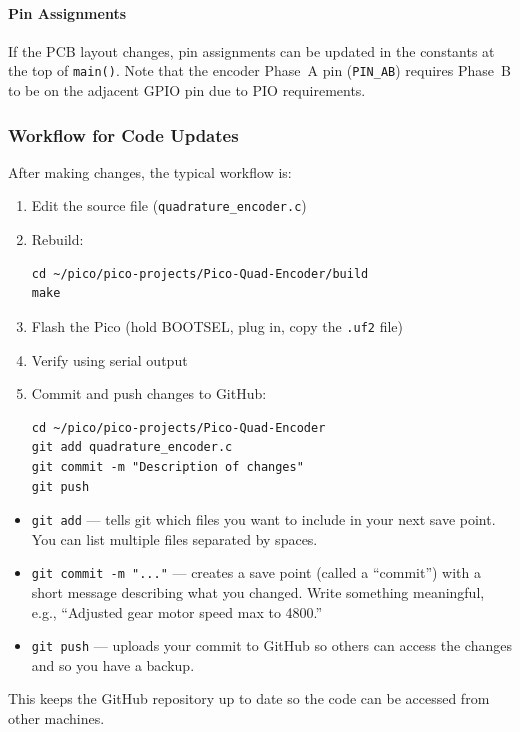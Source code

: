 \documentclass[main.tex]{subfiles}
\begin{document}
\paragraph{Pin Assignments}

If the PCB layout changes, pin assignments can be updated in the constants at the top of \texttt{main()}. Note that the encoder Phase~A pin (\texttt{PIN\_AB}) requires Phase~B to be on the adjacent GPIO pin due to PIO requirements.

\subsubsection{Workflow for Code Updates}

After making changes, the typical workflow is:

\begin{enumerate}
    \item Edit the source file (\texttt{quadrature\_encoder.c})
    \item Rebuild:
\begin{verbatim}
cd ~/pico/pico-projects/Pico-Quad-Encoder/build
make
\end{verbatim}
    \item Flash the Pico (hold BOOTSEL, plug in, copy the \texttt{.uf2} file)
    \item Verify using serial output
    \item Commit and push changes to GitHub:
\begin{verbatim}
cd ~/pico/pico-projects/Pico-Quad-Encoder
git add quadrature_encoder.c
git commit -m "Description of changes"
git push
\end{verbatim}
\end{enumerate}

\begin{itemize}
    \item \texttt{git add} --- tells git which files you want to include in your next save point. You can list multiple files separated by spaces.
    \item \texttt{git commit -m "..."} --- creates a save point (called a ``commit'') with a short message describing what you changed. Write something meaningful, e.g., ``Adjusted gear motor speed max to 4800.''
    \item \texttt{git push} --- uploads your commit to GitHub so others can access the changes and so you have a backup.
\end{itemize}

\noindent This keeps the GitHub repository up to date so the code can be accessed from other machines.
\end{document}
